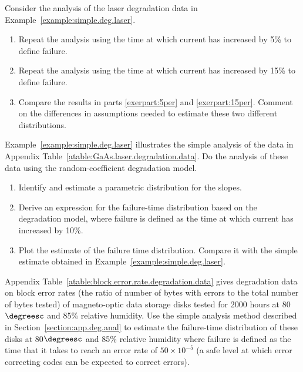\begin{exercise}
Consider the analysis of the laser degradation data
in Example~\ref{example:simple.deg.laser}.
\begin{enumerate}
\item
\label{exerpart:5per}
Repeat the analysis using the time at
which current has increased by 5\% to define failure.
\item
\label{exerpart:15per}
Repeat the analysis using the time at
which current has increased by 15\% to define failure.
\item
Compare the results in parts 
\ref{exerpart:5per} and \ref{exerpart:15per}. Comment on the
differences in assumptions needed to estimate these two different
distributions.
\end{enumerate}
\end{exercise}

\begin{exercise1}
Example~\ref{example:simple.deg.laser} illustrates the simple
analysis of the data in Appendix
Table~\ref{atable:GaAs.laser.degradation.data}. Do the analysis of
these data using the random-coefficient degradation model.
\begin{enumerate}
\item
Identify and estimate a parametric distribution for the slopes.
\item
Derive an expression for the failure-time distribution based on the
degradation model, where failure is defined as the time at
which current has increased by 10\%.
\item
Plot the estimate of the failure time distribution. Compare it with
the simple estimate obtained in
Example~\ref{example:simple.deg.laser}.
\end{enumerate}
\end{exercise1}

\begin{exercise}
\label{exercise:block.error.rate.degradation.data}
Appendix Table~\ref{atable:block.error.rate.degradation.data} gives
degradation data on block error rates (the ratio of number of bytes
with errors to the total number of bytes tested) of magneto-optic data
storage disks tested for 2000 hours at 80$\degreesc$ and 85\%
relative humidity. Use the simple analysis method described in
Section~\ref{section:app.deg.anal} to estimate the failure-time
distribution of these disks at 80$\degreesc$ and 85\% relative
humidity where failure is defined as the time that it takes to reach
an error rate of $50 \times 10^{-5}$ (a safe level at which error
correcting codes can be expected to correct errors).
\end{exercise}

